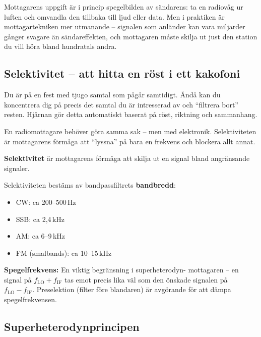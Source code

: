 \documentclass[a4paper,11pt,twoside]{book}
\newcommand{\emoji}[1]{{\emojifont #1}}
\begin{document}
Mottagarens uppgift är i princip spegelbilden av sändarens: ta
en radiovåg ur luften och omvandla den tillbaka till ljud eller data.
Men i praktiken är mottagartekniken mer utmanande -- signalen
som anländer kan vara miljarder gånger svagare än sändareffekten,
och mottagaren måste skilja ut just den station du vill höra
bland hundratals andra.

\subsection{Selektivitet -- att hitta en röst i ett kakofoni}

\begin{storybox}[{\emoji{🎭} Cocktailpartyeffekten}]
Du är på en fest med tjugo samtal som pågår samtidigt. Ändå kan
du koncentrera dig på precis det samtal du är intresserad av och
``filtrera bort'' resten. Hjärnan gör detta automatiskt baserat
på röst, riktning och sammanhang.

En radiomottagare behöver göra samma sak -- men med elektronik.
Selektiviteten är mottagarens förmåga att ``lyssna'' på bara en
frekvens och blockera allt annat.
\end{storybox}

\begin{bluebox}[title={\emoji{🔑} Selektivitet och bandbredd}]
\textbf{Selektivitet} är mottagarens förmåga att skilja ut en
signal bland angränsande signaler.

\medskip
Selektiviteten bestäms av bandpassfiltrets \textbf{bandbredd}:
\begin{itemize}
  \item CW: ca 200--500\,Hz
  \item SSB: ca 2,4\,kHz
  \item AM: ca 6--9\,kHz
  \item FM (smalbands): ca 10--15\,kHz
\end{itemize}

\textbf{Spegelfrekvens:} En viktig begränsning i superheterodyn-
mottagaren -- en signal på $f_{\text{LO}} + f_{\text{IF}}$ tas emot
precis lika väl som den önskade signalen på $f_{\text{LO}} - f_{\text{IF}}$.
Preselektion (filter före blandaren) är avgörande för att dämpa
spegelfrekvensen.
\end{bluebox}

\subsection{Superheterodynprincipen}
\end{document}
